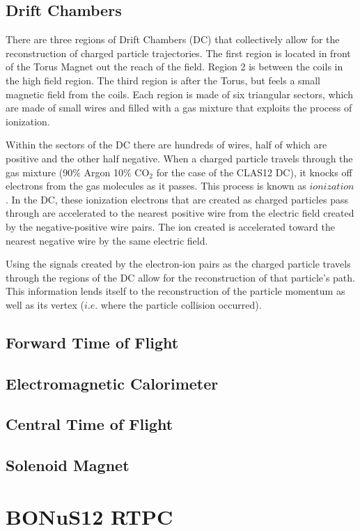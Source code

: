 \subsection{Drift Chambers}
There are three regions of Drift Chambers (DC) that collectively allow for the reconstruction of charged particle trajectories. The first region is located in front of the Torus Magnet out the reach of the field. Region 2 is between the coils in the high field region. The third region is after the Torus, but feels a small magnetic field from the coils. Each region is made of six triangular sectors, which are made of small wires and filled with a gas mixture that exploits the process of ionization.

Within the sectors of the DC there are hundreds of wires, half of which are positive and the other half negative. When a charged particle travels through the gas mixture (90$\%$ Argon 10$\%$ CO$_2$ for the case of the CLAS12 DC), it knocks off electrons from the gas molecules as it passes. This process is known as $ionization$. In the DC, these ionization electrons that are created as charged particles pass through are accelerated to the nearest positive wire from the electric field created by the negative-positive wire pairs. The ion created is accelerated toward the nearest negative wire by the same electric field.

Using the signals created by the electron-ion pairs as the charged particle travels through the regions of the DC allow for the reconstruction of that particle's path. This information lends itself to the reconstruction of the particle momentum as well as its vertex ($i.e.$ where the particle collision occurred).
\subsection{Forward Time of Flight}
\subsection{Electromagnetic Calorimeter}
\subsection{Central Time of Flight}
\subsection{Solenoid Magnet}

\section{BONuS12 RTPC}
